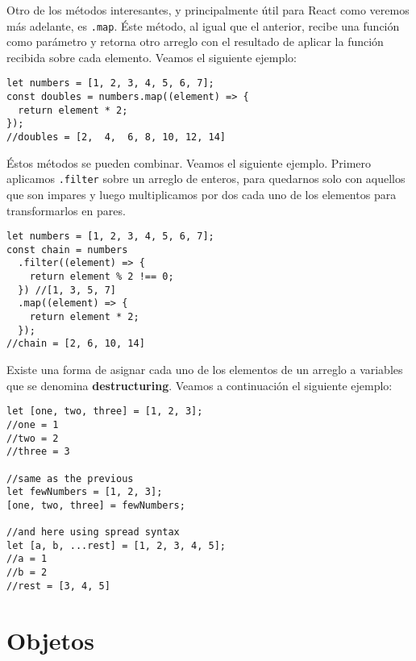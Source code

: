 \documentclass[a4paper, oneside, titlepage, 12pt]{paper}
\begin{document}
Otro de los métodos interesantes, y principalmente útil para React como veremos más adelante, es \texttt{.map}. Éste método, al igual que el anterior, recibe una función como parámetro y retorna otro arreglo con el resultado de aplicar la función recibida sobre cada elemento. Veamos el siguiente ejemplo:

\begin{verbatim}
let numbers = [1, 2, 3, 4, 5, 6, 7];
const doubles = numbers.map((element) => {
  return element * 2;
});
//doubles = [2,  4,  6, 8, 10, 12, 14]
\end{verbatim}

Éstos métodos se pueden combinar. Veamos el siguiente ejemplo. Primero aplicamos \texttt{.filter} sobre un arreglo de enteros, para quedarnos solo con aquellos que son impares y luego multiplicamos por dos cada uno de los elementos para transformarlos en pares. 

\begin{verbatim}
let numbers = [1, 2, 3, 4, 5, 6, 7];
const chain = numbers
  .filter((element) => {
    return element % 2 !== 0;
  }) //[1, 3, 5, 7]
  .map((element) => {
    return element * 2;
  });
//chain = [2, 6, 10, 14]
\end{verbatim}

Existe una forma de asignar cada uno de los elementos de un arreglo a variables que se denomina \textbf{destructuring}. Veamos a continuación el siguiente ejemplo:

\begin{verbatim}
let [one, two, three] = [1, 2, 3];
//one = 1
//two = 2
//three = 3

//same as the previous
let fewNumbers = [1, 2, 3];
[one, two, three] = fewNumbers;

//and here using spread syntax
let [a, b, ...rest] = [1, 2, 3, 4, 5];
//a = 1
//b = 2
//rest = [3, 4, 5]
\end{verbatim}

\section{Objetos}\label{jsobjects}
\end{document}
